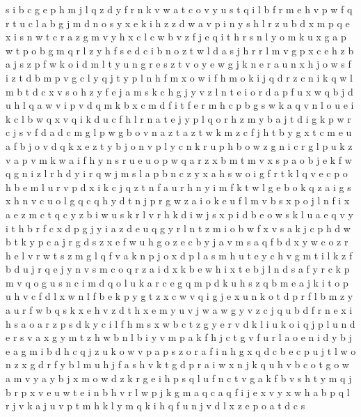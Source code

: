 \documentclass{article}
\begin{document}
s i b c g e p h m j l q z d y f r n k v w a t
c o v y u s t q i l b f r m e h
v p w f q r t u c l a b g j m d n o s y x e k i h z
z d w a v p i n y s h l r
z
u b d x m p
q e x i s n w t c r a z
g m v y h x c l
c w b v z f j e q i t h r s n l y o m k u x g a p
w t p o b g m q r l z y h f s e d
c i b n o z t w l d a s j h r
r
l m v g p x c e h z b
a j s z p f w k o i d m l t y u n g r e
s z t v o y e w g j k n
e r a u n x h j o w s f i z t d b m p v g c l y q
j t y p l n h f m x o w i
f h m o k i j q d r z c
n i k q w l m b t d c x v s o h z y f e j a
m s k c h g j y v z l n t e i o r d a p f u x w q b
j d u h l q a w v i p
v d q m k b
x c m d
f
i t f e r m h c p b g s w k a q v n l o
u e i k c l b w q
x v q i k d u c f h l r n a t e j y p
l q o r h z m y b a j t d i g
k p w r c j s v f d
a d c m g l p w
g b o v n a z t
a z
t w k m z c
f j h t b y g
x t c m e u a f b j o
v d q k x e z t y
b j o n v p l y
c n
k r u p h b o w z g n
i c r g l p u k z v a
p v m k w a i f h y n s r u e
u o p w q a r z x b m
t m v x s p a o b j e k f w q g n i z l r h d y
i r q w j m s l a p b n c z
y x a h s w o i g f r t k l q v e c p
o h b e m l u r v p d x i k c j q z t n f
a u r h n y i m f k t w l g e b o
k q z a i g s x h n v c
u o l g q
c q h y d t n j p r g w z a i o k e u f l m v b s x
p o j l n f i x a e z m c
t q c y z b i w u s k r
l v
r
h k d i
w j s x p i d b e
o w s k l u a e q v y i t h b r f c x d p g j
y i a z d
e u q g y r l n t z m i o b w f x v s a k j c p h d
w b t k y p c a j r g d s z x e f
w u h g o z e c b y j a v
m s a q f b d x y w c o z r h e l v
r w t s z m g l q f v a k n p j o x
d p l a s m h u t e
y c h v g m t i l k z f b d u j r q e
j y n v s m c o q r z a i d x k b e
w h i x t e b j l n d s a f y r c k p m v q o g u
s n c i m d q o l u k
a r c
e g q m p d k u h
s z q b m e a j k i t o p u h v c f d l x w n
l f b e k p y g t z x
c w v q i g j e x u n k o t d p r f l b m z y a
u r f w b q s k x e h v z d t
h x e m y u v j w a
w g y v z c j q u b d f r n e x i h s a o
a r z p s d k y
c i l f
h m s x w b c t z g y e r v d k l i u
k o i q j p l u n d e r s v a x g y m t z h w b
n l b i y v m p a k f h j c t
g v f u r l a o e n i d y b j
e a g m i b d h c q j z u k o
w v p a
p s z o r a f
i n h g x q d c b e
c p u j t l w o n z x g d r f
y b l m u h
j f a s h v k
t g d p r a i w x n j k q u h v b c o
t g o w a m v y
a y b j x m o w d z k r g e i h p s q l u f n c t v
g a k f b v
s h t y m q j b r p x v e u w
t e i n b h v r l w p j k g m a q c
a q f i j e x v y
x w h a b p q l r j v k
a j u v p t m h k l
y m q
k i h q f u n j v d l x z e p o a t
d c s
\end{document}
